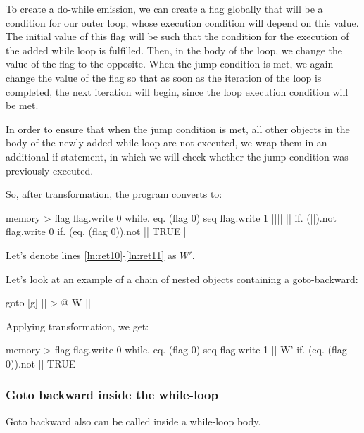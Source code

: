 \documentclass[sigplan,review,11pt,nonacm,natbib=false]{acmart}
\begin{document}
To create a do-while emission, we can create a flag globally that will be a condition for our outer loop, whose execution condition will depend on this value. The initial value of this flag will be such that the condition for the execution of the added while loop is fulfilled. Then, in the body of the loop, we change the value of the flag to the opposite. When the jump condition is met, we again change the value of the flag so that as soon as the iteration of the loop is completed, the next iteration will begin, since the loop execution condition will be met.

In order to ensure that when the jump condition is met, all other objects in the body of the newly added while loop are not executed, we wrap them in an additional if-statement, in which we will check whether the jump condition was previously executed.

So, after transformation, the program converts to:
\begin{ffcode}

memory > flag
flag.write 0
while.
  eq. (flag 0)
  seq
    flag.write 1
    |||$\label{ln:ret10}$|
      ||
      if.
        (||).not
        ||
        flag.write 0
      if.
        (eq. (flag 0)).not
        ||
        TRUE|$\label{ln:ret11}$|
    
\end{ffcode}

Let's denote lines \ref{ln:ret10}-\ref{ln:ret11} as $W'$.

Let's look at an example of a chain of nested objects containing a goto-backward:

\begin{ffcode}

goto
  [g]
    || > @
      W
      ||

\end{ffcode}

Applying transformation, we get:
\begin{ffcode}

memory > flag
flag.write 0
while.
  eq. (flag 0)
  seq
    flag.write 1
    ||
      W'
      if.
        (eq. (flag 0)).not
        ||
        TRUE

\end{ffcode}


\subsubsection{Goto backward inside the while-loop}
Goto backward also can be called inside a while-loop body.
\end{document}
